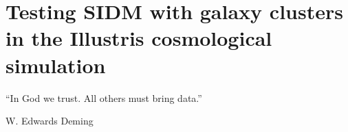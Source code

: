 \documentclass[ucdthesis.tex]{subfiles}
\begin{document}
    
    \doublespacing
		\setcounter{chapter}{2}
		\chapter{Testing SIDM with galaxy clusters in the Illustris cosmological simulation}{}{}
		\label{chapter3}
    \epigraph{``In God we trust. All others must bring data.''}{W. Edwards
		Deming} 

						 

        
\end{document}
